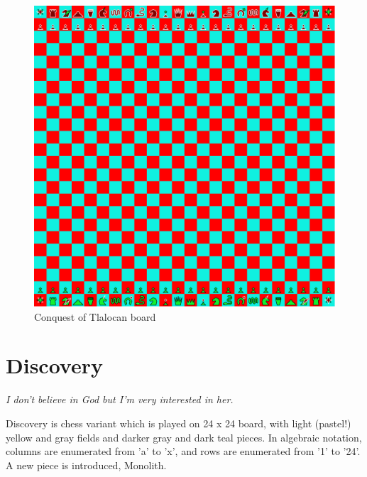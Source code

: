 \documentclass[a5paper,12pt,draft]{book} %
\begin{document}
\noindent
\begin{figure}[h]
\includegraphics[width=1.0\textwidth, keepaspectratio=true]{../gfx/boards/18_conquest_of_tlalocan.png}
\caption{Conquest of Tlalocan board}
\label{fig:conquest_of_tlalocan}
\end{figure}

\clearpage

\chapter*{Discovery}

\begin{flushright}
\parbox{0.8\textwidth}{
\emph{I don’t believe in God but I’m very interested in her. \\
 } }
\end{flushright}

\noindent
Discovery is chess variant which is played on 24 x 24 board, with
light (pastel!) yellow and gray fields and darker gray and dark teal
pieces. In algebraic notation, columns are enumerated from 'a' to 'x',
and rows are enumerated from '1' to '24'. A new piece is introduced,
Monolith.
\end{document}

